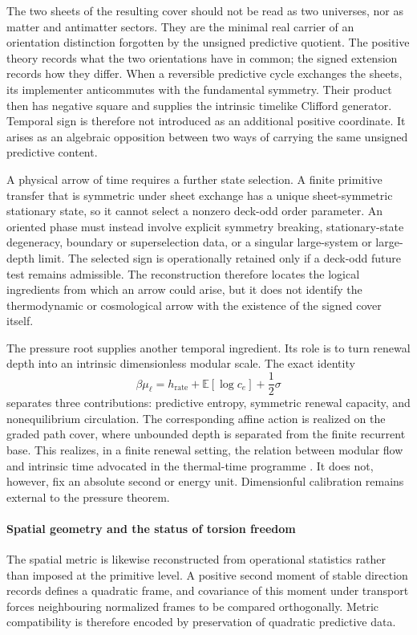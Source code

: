\documentclass[11pt]{article}
\theoremstyle{definition}
\theoremstyle{remark}
\begin{document}
The two sheets of the resulting cover should not be read as two universes, nor
as matter and antimatter sectors.  They are the minimal real carrier of an
orientation distinction forgotten by the unsigned predictive quotient.  The
positive theory records what the two orientations have in common; the signed
extension records how they differ.  When a reversible predictive cycle
exchanges the sheets, its implementer anticommutes with the fundamental
symmetry.  Their product then has negative square and supplies the intrinsic
timelike Clifford generator.  Temporal sign is therefore not introduced as an
additional positive coordinate.  It arises as an algebraic opposition between
two ways of carrying the same unsigned predictive content.

A physical arrow of time requires a further state selection.  A finite
primitive transfer that is symmetric under sheet exchange has a unique
sheet-symmetric stationary state, so it cannot select a nonzero deck-odd order
parameter.  An oriented phase must instead involve explicit symmetry breaking,
stationary-state degeneracy, boundary or superselection data, or a singular
large-system or large-depth limit.  The selected sign is operationally retained
only if a deck-odd future test remains admissible.  The reconstruction therefore
locates the logical ingredients from which an arrow could arise, but it does not
identify the thermodynamic or cosmological arrow with the existence of the
signed cover itself.

The pressure root supplies another temporal ingredient.  Its role is to turn
renewal depth into an intrinsic dimensionless modular scale.  The exact identity
\[
 \beta\mu_\ell
 =h_{\mathrm{rate}}+\mathbb E[\log c_e]+\frac12\sigma
\]
separates three contributions: predictive entropy, symmetric renewal capacity,
and nonequilibrium circulation.  The corresponding affine action is realized
on the graded path cover, where unbounded depth is separated from the finite
recurrent base.  This realizes, in a finite renewal setting, the relation
between modular flow and intrinsic time advocated in the thermal-time
programme \cite{ConnesRovelli1994}.  It does not, however, fix an absolute
second or energy unit.  Dimensionful calibration remains external to the
pressure theorem.

\paragraph{Spatial geometry and the status of torsion freedom} The spatial metric is likewise reconstructed from operational statistics rather
than imposed at the primitive level.  A positive second moment of stable
direction records defines a quadratic frame, and covariance of this moment
under transport forces neighbouring normalized frames to be compared
orthogonally.  Metric compatibility is therefore encoded by preservation of
quadratic predictive data.
\end{document}
